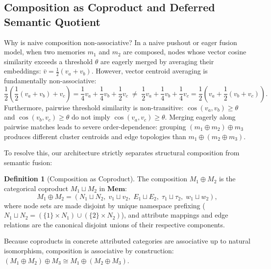 \documentclass[11pt,a4paper]{article}
\theoremstyle{definition}
\newtheorem{definition}{Definition}[section]
\begin{document}
\subsection{Composition as Coproduct and Deferred Semantic Quotient}

Why is naive composition non-associative? In a naive pushout or eager fusion model, when two memories $m_1$ and $m_2$ are composed, nodes whose vector cosine similarity exceeds a threshold $\theta$ are eagerly merged by averaging their embeddings: $\bar{v} = \frac{1}{2}(v_a + v_b)$. However, vector centroid averaging is fundamentally non-associative:
\[
\frac{1}{2}\left(\frac{1}{2}(v_a + v_b) + v_c\right) = \frac{1}{4}v_a + \frac{1}{4}v_b + \frac{1}{2}v_c \;\neq\; \frac{1}{2}v_a + \frac{1}{4}v_b + \frac{1}{4}v_c = \frac{1}{2}\left(v_a + \frac{1}{2}(v_b + v_c)\right).
\]
Furthermore, pairwise threshold similarity is non-transitive: $\cos(v_a, v_b) \geq \theta$ and $\cos(v_b, v_c) \geq \theta$ do not imply $\cos(v_a, v_c) \geq \theta$. Merging eagerly along pairwise matches leads to severe order-dependence: grouping $(m_1 \oplus m_2) \oplus m_3$ produces different cluster centroids and edge topologies than $m_1 \oplus (m_2 \oplus m_3)$.

To resolve this, our architecture strictly separates structural composition from semantic fusion:

\begin{definition}[Composition as Coproduct]
The composition $M_1 \oplus M_2$ is the categorical coproduct $M_1 \sqcup M_2$ in $\mathbf{Mem}$:
\[
M_1 \oplus M_2 = (N_1 \sqcup N_2,\; v_1 \sqcup v_2,\; E_1 \sqcup E_2,\; \tau_1 \sqcup \tau_2,\; w_1 \sqcup w_2),
\]
where node sets are made disjoint by unique namespace prefixing ($N_1 \sqcup N_2 = (\{1\} \times N_1) \cup (\{2\} \times N_2)$), and attribute mappings and edge relations are the canonical disjoint unions of their respective components.
\end{definition}

Because coproducts in concrete attributed categories are associative up to natural isomorphism, composition is associative by construction: $(M_1 \oplus M_2) \oplus M_3 \cong M_1 \oplus (M_2 \oplus M_3)$.
\end{document}
